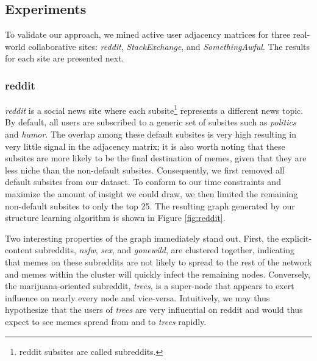 \documentclass{article} %
\begin{document}
\subsection{Experiments}
To validate our approach, we mined active user adjacency matrices for three real-world collaborative sites: \textit{reddit}, \textit{StackExchange}, and \textit{SomethingAwful}. The results for each site are presented next.

\subsubsection{reddit}
\textit{reddit} is a social news site where each subsite\footnote{reddit subsites are called subreddits.} represents a different news topic. By default, all users are subscribed to a generic set of subsites such as \textit{politics} and \textit{humor}. The overlap among these default subsites is very high resulting in very little signal in the adjacency matrix; it is also worth noting that these subsites are more likely to be the final destination of memes, given that they are less niche than the non-default subsites. Consequently, we first removed all default subsites from our dataset. To conform to our time constraints and maximize the amount of insight we could draw, we then limited the remaining non-default subsites to only the top 25. The resulting graph generated by our structure learning algorithm is shown in Figure \ref{fig:reddit}.

Two interesting properties of the graph immediately stand out. First, the explicit-content subreddits, \textit{nsfw}, \textit{sex}, and \textit{gonewild}, are clustered together, indicating that memes on these subreddits are not likely to spread to the rest of the network and memes within the cluster will quickly infect the remaining nodes. Conversely, the marijuana-oriented subreddit, \textit{trees}, is a super-node that appears to exert influence on nearly every node and vice-versa. Intuitively, we may thus hypothesize that the users of \textit{trees} are very influential on reddit and would thus expect to see memes spread from and to \textit{trees} rapidly.
\end{document}
